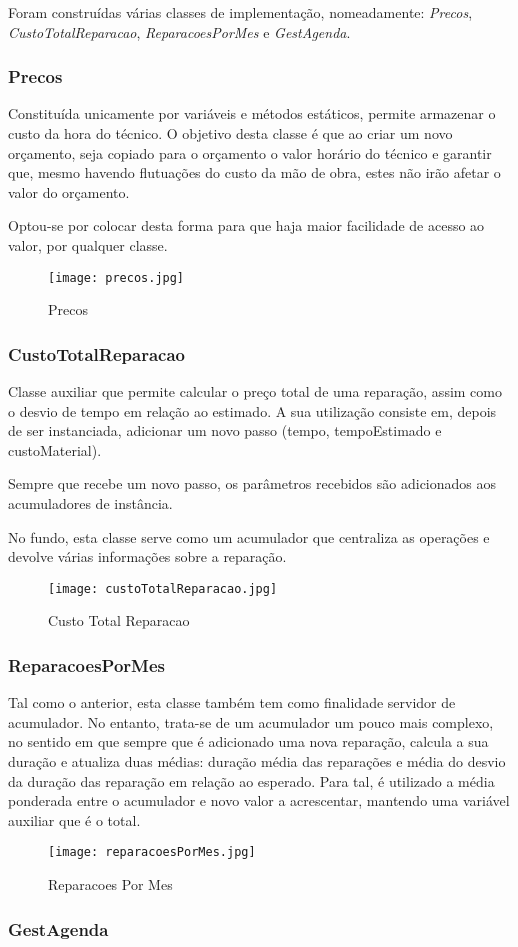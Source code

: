 \documentclass[../../relatorio.tex]{subfiles}
\begin{document}
Foram construídas várias classes de implementação, nomeadamente: 
\textit{Precos}, \textit{CustoTotalReparacao},
\textit{ReparacoesPorMes} e \textit{GestAgenda}.

\subsubsection*{Precos} \label{class:precos}
Constituída unicamente por variáveis e métodos estáticos, permite
armazenar o custo da hora do técnico.
O objetivo desta classe é que ao criar um novo orçamento, seja copiado para o orçamento
o valor horário do técnico e garantir que, mesmo havendo flutuações do custo
da mão de obra, estes não irão afetar o valor do orçamento.

Optou-se por colocar desta forma para que haja maior facilidade de acesso ao valor,
por qualquer classe.

\begin{figure} [!ht]
    \centering
    \texttt{[image: precos.jpg]}
    \caption{Precos}\label{img:precos}
\end{figure}

\subsubsection*{CustoTotalReparacao} \label{class:custo_total_reparacao}
Classe auxiliar que permite calcular o preço total de uma reparação,
assim como o desvio de tempo em relação ao estimado.
A sua utilização consiste em, depois de ser instanciada, adicionar um novo passo
(tempo, tempoEstimado e custoMaterial).

Sempre que recebe um novo passo, os parâmetros recebidos são adicionados
aos acumuladores de instância.

No fundo, esta classe serve como um acumulador que centraliza as operações e
devolve várias informações sobre a reparação.

\begin{figure} [!ht]
    \centering
    \texttt{[image: custoTotalReparacao.jpg]}
    \caption{Custo Total Reparacao}\label{img:custo_total_reparacao}
\end{figure}

\subsubsection*{ReparacoesPorMes} \label{class:reparacoes_por_mes}
Tal como o anterior, esta classe também tem como finalidade servidor de acumulador.
No entanto, trata-se de um acumulador um pouco mais complexo, no sentido
em que sempre que é adicionado uma nova reparação, calcula a sua duração
e atualiza duas médias: duração média das reparações e média do desvio
da duração das reparação em relação ao esperado.
Para tal, é utilizado a média ponderada entre o acumulador e novo valor a acrescentar,
mantendo uma variável auxiliar que é o total.

\begin{figure} [!ht]
    \centering
    \texttt{[image: reparacoesPorMes.jpg]}
    \caption{Reparacoes Por Mes}\label{img:reparacoes_por_mes}
\end{figure}

\subsubsection*{GestAgenda} \label{class:gest_agenda}
\end{document}
